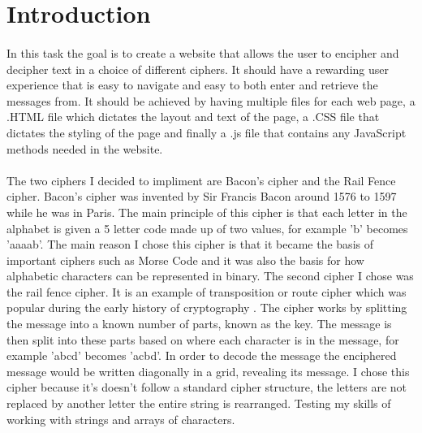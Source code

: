 \documentclass[10pt, a4paper]{article}
\title{\mytitle}
\author{\myauthor\hspace{1em}\\\contact\\Edinburgh Napier University\hspace{0.5em}-\hspace{0.5em}\mymodule}
\date{}
\begin{document}
    \maketitle
    \begin{abstract}
    Abstract goes here
    \end{abstract}

    
    \section{Introduction}
    \paragraph{}In this task the goal is to create a website that allows the user to encipher and decipher text in a choice of different ciphers. It should have a rewarding user experience that is easy to navigate and easy to both enter and retrieve the messages from. It should be achieved by having multiple files for each web page, a .HTML file which dictates the layout and text of the page, a .CSS file that dictates the styling of the page and finally a .js file that contains any JavaScript methods needed in the website.\\ \\ The two ciphers I decided to impliment are Bacon's cipher and the Rail Fence cipher. Bacon's cipher was invented by Sir Francis Bacon around 1576 to 1597 while he was in Paris\cite{Dawkins}. The main principle of this cipher is that each letter in the alphabet is given a 5 letter code made up of two values, for example 'b' becomes 'aaaab'. The main reason I chose this cipher is that it became the basis of important ciphers such as Morse Code and it was also the basis for how alphabetic characters can be represented in binary\cite{Dawkins}. The second cipher I chose was the rail fence cipher. It is an example of transposition or route cipher which was popular during the early history of cryptography \cite{Simmons}. The cipher works by splitting the message into a known number of parts, known as the key. The message is then split into these parts based on where each character is in the message, for example 'abcd' becomes 'acbd'. In order to decode the message the enciphered message would be written diagonally in a grid, revealing its message. I chose this cipher because it's doesn't follow a standard cipher structure, the letters are not replaced by another letter the entire string is rearranged. Testing my skills of working with strings and arrays of characters.   
\end{document}
